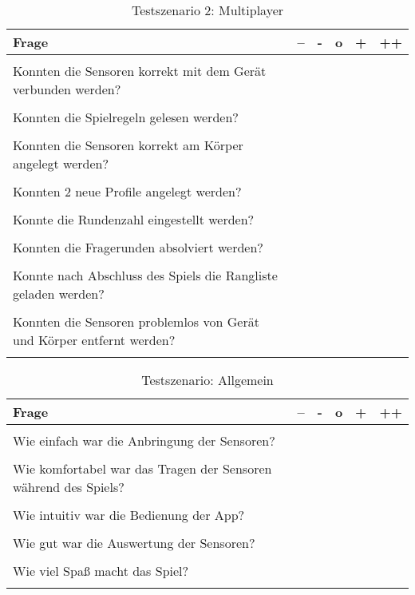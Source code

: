 \begin{table}[h!tp]
	\begin{center}
		\begin{tabular}{@{}|l|c|c|c|c|r|@{}}
			\hline
			Frage & -- & - & o & + & ++ \\
			\hline
			 & & & & & \\
			Konnten die Sensoren korrekt mit dem Gerät verbunden werden? & & & & & \\
			 & & & & & \\
			Konnten die Spielregeln gelesen werden? & & & & & \\
			 & & & & & \\
			Konnten die Sensoren korrekt am Körper angelegt werden? & & & & & \\
			 & & & & & \\
			Konnten 2 neue Profile angelegt werden? & & & & & \\
			 & & & & & \\
			Konnte die Rundenzahl eingestellt werden? & & & & & \\
			 & & & & & \\
			Konnten die Fragerunden absolviert werden? & & & & & \\
			 & & & & & \\
			Konnte nach Abschluss des Spiels die Rangliste geladen werden? & & & & & \\
			 & & & & & \\
			Konnten die Sensoren problemlos von Gerät und Körper entfernt werden? & & & & & \\
			 & & & & & \\
			\hline
		\end{tabular}
	\end{center}
	\caption{Testszenario 2: Multiplayer}
	\label{tab_test_multiplayer}
\end{table}

\begin{table}[h!tp]
	\begin{center}
		\begin{tabular}{@{}|l|c|c|c|c|r|@{}}
			\hline
			Frage & -- & - & o & + & ++ \\
			\hline
			 & & & & & \\
			Wie einfach war die Anbringung der Sensoren? & & & & & \\
			 & & & & & \\
			Wie komfortabel war das Tragen der Sensoren während des Spiels? & & & & & \\
			 & & & & & \\
			Wie intuitiv war die Bedienung der App? & & & & & \\
			 & & & & & \\
			Wie gut war die Auswertung der Sensoren? & & & & & \\
			 & & & & & \\
			Wie viel Spaß macht das Spiel? & & & & & \\
			 & & & & & \\
			\hline
		\end{tabular}
	\end{center}
	\caption{Testszenario: Allgemein}
	\label{tab_test_allgemein}
\end{table}